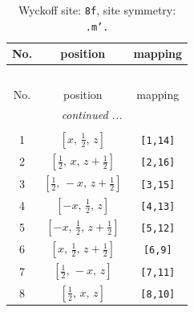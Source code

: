\documentclass[fleqn,8pt]{jsarticle}
\begin{document}
\begin{longtable}{ccc}
\caption{Wyckoff site: {\tt 8f}, site symmetry: {\tt .m'.}}
 \\
 \hline \hline
No. & position & mapping \\ \hline \endfirsthead

\multicolumn{2}{l}{\tablename\ \thetable{}} \\
 \hline \hline
No. & position & mapping \\ \hline \endhead

 \hline \hline
\multicolumn{2}{r}{\footnotesize\it continued ...} \\ \endfoot

 \hline \hline
\multicolumn{2}{r}{} \\ \endlastfoot

1 & $\left[ x,\, \frac{1}{2},\, z \right]$ & {\tt [1,14]} \\ \hline
2 & $\left[ \frac{1}{2},\, x,\, z + \frac{1}{2} \right]$ & {\tt [2,16]} \\ \hline
3 & $\left[ \frac{1}{2},\, - x,\, z + \frac{1}{2} \right]$ & {\tt [3,15]} \\ \hline
4 & $\left[ - x,\, \frac{1}{2},\, z \right]$ & {\tt [4,13]} \\ \hline
5 & $\left[ - x,\, \frac{1}{2},\, z + \frac{1}{2} \right]$ & {\tt [5,12]} \\ \hline
6 & $\left[ x,\, \frac{1}{2},\, z + \frac{1}{2} \right]$ & {\tt [6,9]} \\ \hline
7 & $\left[ \frac{1}{2},\, - x,\, z \right]$ & {\tt [7,11]} \\ \hline
8 & $\left[ \frac{1}{2},\, x,\, z \right]$ & {\tt [8,10]} \\
\end{longtable}
\renewcommand{\arraystretch}{1.2}
\end{document}
